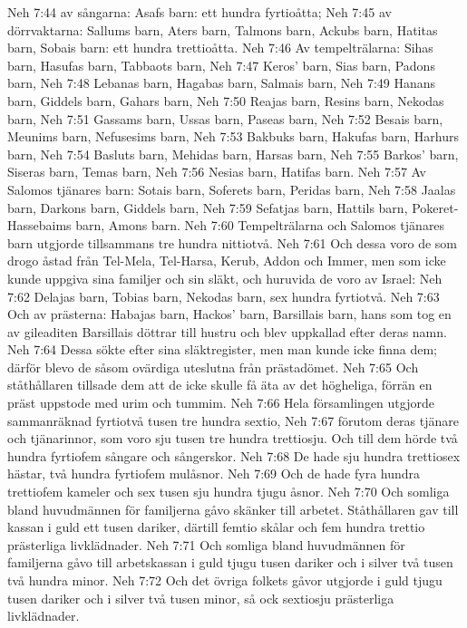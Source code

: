 Neh 7:44  av sångarna: Asafs barn: ett hundra fyrtioåtta;
Neh 7:45  av dörrvaktarna: Sallums barn, Aters barn, Talmons barn, Ackubs barn, Hatitas barn, Sobais barn: ett hundra trettioåtta.
Neh 7:46  Av tempelträlarna: Sihas barn, Hasufas barn, Tabbaots barn,
Neh 7:47  Keros' barn, Sias barn, Padons barn,
Neh 7:48  Lebanas barn, Hagabas barn, Salmais barn,
Neh 7:49  Hanans barn, Giddels barn, Gahars barn,
Neh 7:50  Reajas barn, Resins barn, Nekodas barn,
Neh 7:51  Gassams barn, Ussas barn, Paseas barn,
Neh 7:52  Besais barn, Meunims barn, Nefusesims barn,
Neh 7:53  Bakbuks barn, Hakufas barn, Harhurs barn,
Neh 7:54  Basluts barn, Mehidas barn, Harsas barn,
Neh 7:55  Barkos' barn, Siseras barn, Temas barn,
Neh 7:56  Nesias barn, Hatifas barn.
Neh 7:57  Av Salomos tjänares barn: Sotais barn, Soferets barn, Peridas barn,
Neh 7:58  Jaalas barn, Darkons barn, Giddels barn,
Neh 7:59  Sefatjas barn, Hattils barn, Pokeret-Hassebaims barn, Amons barn.
Neh 7:60  Tempelträlarna och Salomos tjänares barn utgjorde tillsammans tre hundra nittiotvå.
Neh 7:61  Och dessa voro de som drogo åstad från Tel-Mela, Tel-Harsa, Kerub, Addon och Immer, men som icke kunde uppgiva sina familjer och sin släkt, och huruvida de voro av Israel:
Neh 7:62  Delajas barn, Tobias barn, Nekodas barn, sex hundra fyrtiotvå.
Neh 7:63  Och av prästerna: Habajas barn, Hackos' barn, Barsillais barn, hans som tog en av gileaditen Barsillais döttrar till hustru och blev uppkallad efter deras namn.
Neh 7:64  Dessa sökte efter sina släktregister, men man kunde icke finna dem; därför blevo de såsom ovärdiga uteslutna från prästadömet.
Neh 7:65  Och ståthållaren tillsade dem att de icke skulle få äta av det högheliga, förrän en präst uppstode med urim och tummim.
Neh 7:66  Hela församlingen utgjorde sammanräknad fyrtiotvå tusen tre hundra sextio,
Neh 7:67  förutom deras tjänare och tjänarinnor, som voro sju tusen tre hundra trettiosju. Och till dem hörde två hundra fyrtiofem sångare och sångerskor.
Neh 7:68  De hade sju hundra trettiosex hästar, två hundra fyrtiofem mulåsnor.
Neh 7:69  Och de hade fyra hundra trettiofem kameler och sex tusen sju hundra tjugu åsnor.
Neh 7:70  Och somliga bland huvudmännen för familjerna gåvo skänker till arbetet. Ståthållaren gav till kassan i guld ett tusen dariker, därtill femtio skålar och fem hundra trettio prästerliga livklädnader.
Neh 7:71  Och somliga bland huvudmännen för familjerna gåvo till arbetskassan i guld tjugu tusen dariker och i silver två tusen två hundra minor.
Neh 7:72  Och det övriga folkets gåvor utgjorde i guld tjugu tusen dariker och i silver två tusen minor, så ock sextiosju prästerliga livklädnader.
